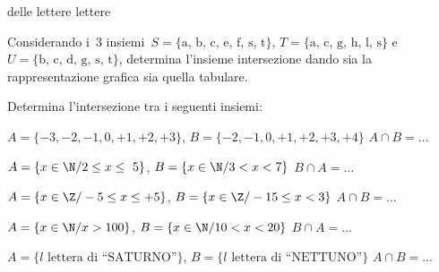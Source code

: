 delle 
lettere 
% 
% 
% 
lettere 

\begin{esercizio}
 \label{ese:7.12}
Considerando i~3 insiemi~\(S=\{\text{a, b, c, e, f, s, t}\}\), \(T=\{\text{a, 
c, g, 
h, l, s}\}\) e~\(U=\{\text{b, c, d, g, s, t}\}\),
determina l'insieme intersezione dando sia la rappresentazione grafica sia 
quella tabulare.
 \end{esercizio}

\begin{esercizio}
 \label{ese:7.13}
 Determina l'intersezione tra i seguenti insiemi:
\begin{enumeratea}
 \item \(A=\{-3, -2, -1, 0, +1, +2, +3\}\), \(B=\{-2,-1, 0, +1, +2, +3, 
+4\}\) 
\(A\cap B=\ldots\)
 \item \(A=\{x\in\N/2\le x\le~5\}\), \(B=\{x\in\N/3<x<7\}\) \(B\cap A=\ldots\)
 \item \(A=\{x\in\Z/-5\le x\le+5\}\), \(B=\{x\in\Z/-15\le x<3\}\) 
\(A\cap 
B=\ldots\)
 \item \(A=\{x\in\N/x>100\}\), \(B=\{x\in\N/10<x<20\}\) \(B\cap A=\ldots\)
 \item \(A=\{l\text{ lettera di ``SATURNO''}\}\), \(B=\{l\text{ lettera di 
``NETTUNO''}\}\) \(A\cap B=\ldots\)
\end{enumeratea}
\end{esercizio}


